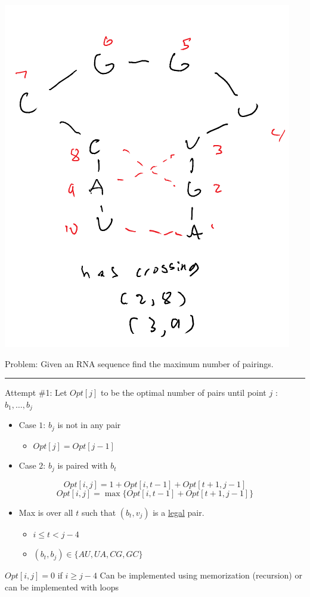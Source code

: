 \documentclass[11pt]{article}
\begin{document}
\begin{center}
\includegraphics[width=.9\linewidth]{./Images/i90.png}
\end{center}

Problem: Given an RNA sequence find the maximum number of pairings.

\noindent\rule{\textwidth}{0.5pt}
Attempt \#1: Let \(Opt[j]\) to be the optimal number of pairs until point \(j\) : \(b_1,\ldots,b_j\)
\begin{itemize}
\item Case \(1\): \(b_j\) is not in any pair
\begin{itemize}
\item \(Opt[j] = Opt[j-1]\)
\end{itemize}
\item Case \(2\): \(b_j\) is paired with \(b_t\)
\end{itemize}
$$Opt[i,j] = 1 + Opt[i,t-1]+Opt[t+1,j-1]$$
$$Opt[i,j] = \max \{Opt[i,t-1]+Opt[t+1,j-1]\}$$
\begin{itemize}
\item Max is over all \(t\) such that \((b_t,v_j)\) is a \uline{legal} pair.
\begin{itemize}
\item \(i \leq t < j-4\)
\item \((b_t,b_j) \in \{AU, UA, CG, GC\}\)
\end{itemize}
\end{itemize}
\(Opt[i,j] = 0\) if \(i \geq j-4\)
Can be implemented using memorization (recursion) or can be implemented with loops
\end{document}
